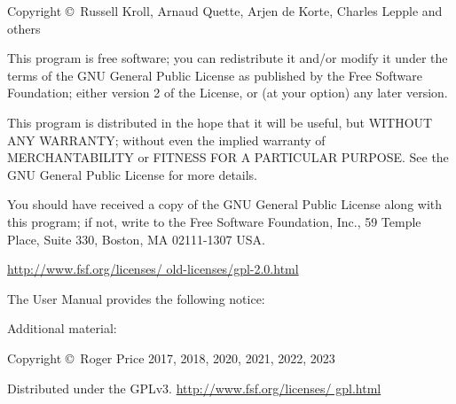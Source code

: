 \documentclass[12pt]{article}
\begin{document}
\vspace{5mm}

\textsf{Copyright \copyright\ Russell Kroll, Arnaud Quette, Arjen de Korte,
  Charles Lepple and others}

\vspace{5mm}

\textsf{This program is free software; you can redistribute it and/or modify
  it under the terms of the GNU General Public License as published by the
  Free Software Foundation; either version 2 of the License, or (at your
  option) any later version.}

\textsf{This program is distributed in the hope that it will be useful, but
  WITHOUT ANY WARRANTY; without even the implied warranty of MERCHANTABILITY
  or FITNESS FOR A PARTICULAR PURPOSE.  See the GNU General Public License for
  more details.}

\textsf{You should have received a copy of the GNU General Public License
  along with this program; if not, write to the Free Software Foundation,
  Inc., 59 Temple Place, Suite 330, Boston, MA 02111-1307 USA.}
  
\href{http://www.fsf.org/licenses/old-licenses/gpl-2.0.html}
     {http://{\allowbreak}www.fsf.org/{\allowbreak}licenses/%
       {\allowbreak}old-licenses/{\allowbreak}gpl-2.0.html}

\vspace*{\fill}

The User Manual provides the following notice: 


\vspace*{\fill}

Additional material:

\textsf{Copyright \copyright\ Roger Price 2017, 2018, 2020, 2021, 2022, 2023}

\textsf{Distributed under the GPLv3.}
\href{http://www.fsf.org/licenses/gpl.html}
     {http://{\allowbreak}www.fsf.org/{\allowbreak}licenses/%
       {\allowbreak}gpl.html}
\end{document}
